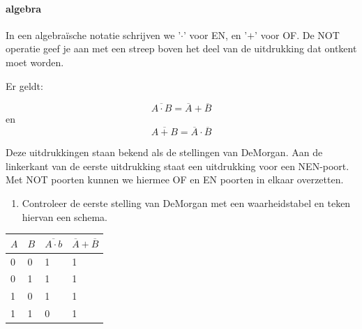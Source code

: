 \documentclass[../../main.tex]{subfiles}
\begin{document}
\paragraph{algebra}In een algebra\"ische notatie schrijven we '$\cdot$' voor EN, en '$+$' voor OF. De NOT operatie geef je aan met een streep boven het deel van de uitdrukking dat ontkent moet worden. 

Er geldt:

\[ \overline{{A} \cdot {B}} = \overline{A} + \overline{B}\]
en
\[ \overline{{A} + {B}} = \overline{A} \cdot \overline{B}\]

Deze uitdrukkingen staan bekend als de stellingen van DeMorgan. Aan de linkerkant van de eerste uitdrukking staat een uitdrukking voor een NEN-poort. Met NOT poorten kunnen we hiermee OF en EN poorten in elkaar overzetten. 
\medskip
\begin{enumerate}
\item Controleer de eerste stelling van DeMorgan met een waarheidstabel en teken hiervan een schema.
\end{enumerate}
\begin{antwoord}
\scriptsize{%
\begin{tabular}{|l|l|l||l|}
$A$ & $B$ & $\overline{A \cdot b}$ & $\overline{A} + \overline{B} $ \\ \hline
0     & 0     & 1 & 1 \\ \hline
0     & 1     & 1 & 1 \\ \hline
1     & 0     & 1 & 1 \\ \hline
1     & 1     & 0 & 1 \\ \hline
\end{tabular}
}
\end{antwoord}
\end{document}
